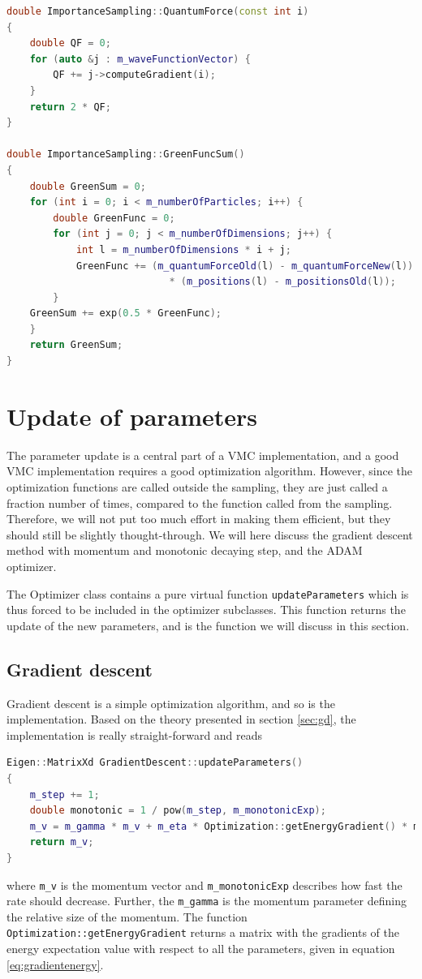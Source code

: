 \begin{lstlisting}[language=c++,caption={Taken from \lstinline{importancesampling.cpp}.}]
double ImportanceSampling::QuantumForce(const int i)
{
	double QF = 0;
	for (auto &j : m_waveFunctionVector) {
		QF += j->computeGradient(i);
	}
	return 2 * QF;
}

double ImportanceSampling::GreenFuncSum()
{
	double GreenSum = 0;
	for (int i = 0; i < m_numberOfParticles; i++) {
		double GreenFunc = 0;
		for (int j = 0; j < m_numberOfDimensions; j++) {
			int l = m_numberOfDimensions * i + j;
			GreenFunc += (m_quantumForceOld(l) - m_quantumForceNew(l))
							* (m_positions(l) - m_positionsOld(l));
		}
	GreenSum += exp(0.5 * GreenFunc);
	}
	return GreenSum;
}
\end{lstlisting}

\section{Update of parameters} \label{sec:update}
The parameter update is a central part of a VMC implementation, and a good VMC implementation requires a good optimization algorithm. However, since the optimization functions are called outside the sampling, they are just called a fraction number of times, compared to the function called from the sampling. Therefore, we will not put too much effort in making them efficient, but they should still be slightly thought-through. We will here discuss the gradient descent method with momentum and monotonic decaying step, and the ADAM optimizer. 

The Optimizer class contains a pure virtual function \lstinline|updateParameters| which is thus forced to be included in the optimizer subclasses. This function returns the update of the new parameters, and is the function we will discuss in this section.

\subsection{Gradient descent}
Gradient descent is a simple optimization algorithm, and so is the implementation. Based on the theory presented in section \ref{sec:gd}, the implementation is really straight-forward and reads
\begin{lstlisting}[language=c++,caption={Taken from \lstinline{gradientdescent.cpp}.}]
Eigen::MatrixXd GradientDescent::updateParameters()
{
	m_step += 1;
	double monotonic = 1 / pow(m_step, m_monotonicExp);
	m_v = m_gamma * m_v + m_eta * Optimization::getEnergyGradient() * monotonic;
	return m_v;
}
\end{lstlisting}
where \lstinline|m_v| is the momentum vector and \lstinline|m_monotonicExp| describes how fast the rate should decrease. Further, the \lstinline|m_gamma| is the momentum parameter defining the relative size of the momentum. The function \lstinline|Optimization::getEnergyGradient| returns a matrix with the gradients of the energy expectation value with respect to all the parameters, given in equation \eqref{eq:gradientenergy}.


